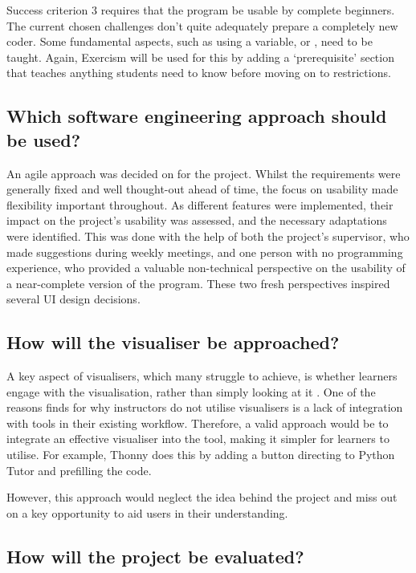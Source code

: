 Success criterion 3 requires that the program be usable by complete beginners. The current chosen challenges don't quite adequately prepare a completely new coder. Some fundamental aspects, such as using a variable, or , need to be taught. Again, Exercism will be used for this by adding a `prerequisite' section that teaches anything students need to know before moving on to restrictions.

\subsection{Which software engineering approach should be used?}

An agile approach was decided on for the project. Whilst the requirements were generally fixed and well thought-out ahead of time, the focus on usability made flexibility important throughout. As different features were implemented, their impact on the project's usability was assessed, and the necessary adaptations were identified. This was done with the help of both the project's supervisor, who made suggestions during weekly meetings, and one person with no programming experience, who provided a valuable non-technical perspective on the usability of a near-complete version of the program. These two fresh perspectives inspired several UI design decisions.

\subsection{How will the visualiser be approached?}

A key aspect of visualisers, which many struggle to achieve, is whether learners engage with the visualisation, rather than simply looking at it \cite{sorva_review_2013}. One of the reasons \citep{sorva_review_2013} finds for why instructors do not utilise visualisers is a lack of integration with tools in their existing workflow. Therefore, a valid approach would be to integrate an effective visualiser into the tool, making it simpler for learners to utilise. For example, Thonny \cite{annamaa_introducing_2015} does this by adding a button directing to Python Tutor and prefilling the code.

However, this approach would neglect the idea behind the project and miss out on a key opportunity to aid users in their understanding.

\subsection{How will the project be evaluated?}

